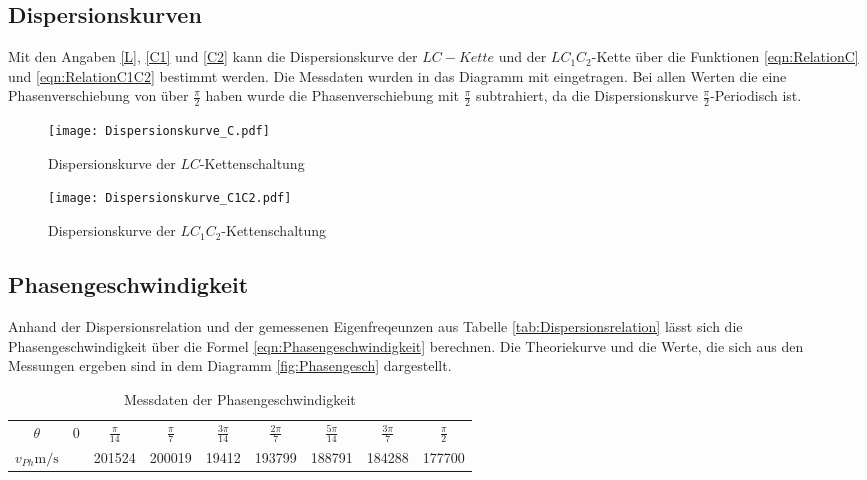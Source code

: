 \subsection{Dispersionskurven}

Mit den Angaben \eqref{L}, \eqref{C1} und \eqref{C2} kann die Dispersionskurve
der $LC-Kette$ und der $LC_1C_2$-Kette über die Funktionen \eqref{eqn:RelationC}
und \eqref{eqn:RelationC1C2} bestimmt werden.
Die Messdaten wurden in das Diagramm mit eingetragen. Bei allen Werten die eine
Phasenverschiebung von über $\frac{\pi}{2}$ haben wurde die Phasenverschiebung
mit $\frac{\pi}{2}$ subtrahiert, da die Dispersionskurve $\frac{\pi}{2}$-Periodisch
ist.

\begin{figure}
  \texttt{[image: Dispersionskurve\_C.pdf]}
  \caption{Dispersionskurve der $LC$-Kettenschaltung}
  \label{fig:DispersionC}
\end{figure}
\begin{figure}
  \texttt{[image: Dispersionskurve\_C1C2.pdf]}
  \caption{Dispersionskurve der $LC_1C_2$-Kettenschaltung}
  \label{fig:DispersionC1C2}
\end{figure}
\FloatBarrier

\subsection{Phasengeschwindigkeit}

Anhand der Dispersionsrelation und der gemessenen Eigenfreqeunzen aus Tabelle
\ref{tab:Dispersionsrelation} lässt sich die Phasengeschwindigkeit über die
Formel \eqref{eqn:Phasengeschwindigkeit} berechnen.
Die Theoriekurve und die Werte, die sich aus den Messungen ergeben sind in
dem Diagramm \ref{fig:Phasengesch} dargestellt.

\FloatBarrier
\begin{table}
 \centering
 \begin{tabular}[width=\textwidth]{S| S S S S S S S S}
    \midrule
    $\theta$ & 0 & $\frac{\pi}{14}$ & $\frac{\pi}{7}$ & $\frac{3\pi}{14}$ & $\frac{2\pi}{7}$ & $\frac{5\pi}{14}$ & $\frac{3\pi}{7}$ & $\frac{\pi}{2}$ \\
    $v_{Ph}$$\si{\meter\per\second}$ & \text{\,\,\,\,\,\,\,\,\,\,\,\,\,\,\,\,--} & 201524 & 200019 & 19412 & 193799 & 188791 & 184288 & 177700 \\
    \bottomrule
\end{tabular}
  \caption{Messdaten der Phasengeschwindigkeit}
  \label{tab:Phasengesch}
\end{table}
\FloatBarrier

